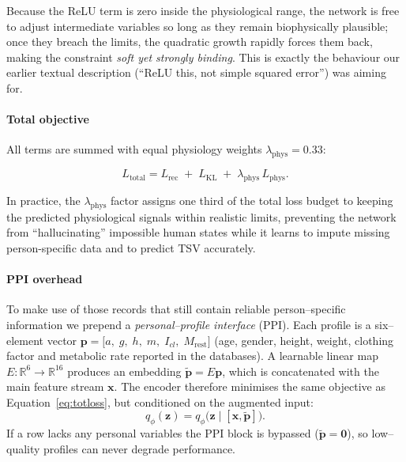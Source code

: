 Because the ReLU term is zero inside the physiological range, the network is free to adjust intermediate variables so long as they remain biophysically plausible; once they breach the limits, the quadratic growth rapidly forces them back, making the constraint \emph{soft yet strongly binding}.  This is exactly the behaviour our earlier textual description (“ReLU this, not simple squared error”) was aiming for.


\paragraph{Total objective}
All terms are summed with equal physiology weights $\lambda_{\text{phys}}=0.33$:

\begin{equation}
    L_{\text{total}} = L_{\text{rec}} \;+\; L_{\text{KL}} \;+\; \lambda_{\text{phys}}\,L_{\text{phys}}.\label{eq:totloss}
\end{equation}

\noindent
In practice, the $\lambda_{\text{phys}}$ factor assigns one third of the total loss budget to keeping the predicted physiological signals within realistic limits, preventing the network from “hallucinating” impossible human states while it learns to impute missing person-specific data and to predict TSV accurately.

\paragraph{PPI overhead}
To make use of those records that still contain reliable person--specific information we prepend a \emph{personal–profile interface} (PPI). Each profile is a six--element vector
\(
  \mathbf p=
  \bigl[
     a,\;g,\;h,\;m,\;I_{cl},\;M_{\text{rest}}
  \bigr]
\)
(age, gender, height, weight, clothing factor and metabolic rate reported in the databases).  A learnable linear map
\(E:\mathbb R^{6}\!\rightarrow\!\mathbb R^{16}\) produces an
embedding
\(\tilde{\mathbf p}=E\mathbf p\),
which is concatenated with the main feature stream \(\mathbf x\). The encoder therefore minimises the same objective as Equation~\ref{eq:totloss}, but conditioned on the augmented input:
\begin{equation}
  q_{\phi}(\mathbf z)=q_{\phi}\bigl(\mathbf z\mid[\mathbf x,\tilde{\mathbf p}]\bigr).
\end{equation}
If a row lacks any personal variables the PPI block is bypassed (\(\tilde{\mathbf p}=\mathbf 0\)), so low–quality profiles can never degrade performance.


